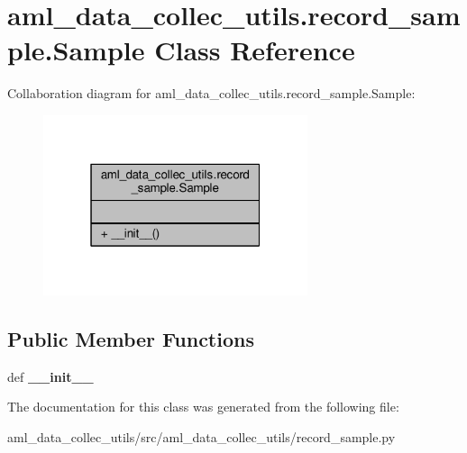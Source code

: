 \hypertarget{classaml__data__collec__utils_1_1record__sample_1_1_sample}{\section{aml\-\_\-data\-\_\-collec\-\_\-utils.\-record\-\_\-sample.\-Sample Class Reference}
\label{classaml__data__collec__utils_1_1record__sample_1_1_sample}
}


Collaboration diagram for aml\-\_\-data\-\_\-collec\-\_\-utils.\-record\-\_\-sample.\-Sample\-:
\nopagebreak
\begin{figure}[H]
\begin{center}
\leavevmode
\includegraphics[width=220pt]{classaml__data__collec__utils_1_1record__sample_1_1_sample__coll__graph}
\end{center}
\end{figure}
\subsection*{Public Member Functions}
\begin{DoxyCompactItemize}
\item 
\hypertarget{classaml__data__collec__utils_1_1record__sample_1_1_sample_aec601499ea26c9738626b603c193b962}{def {\bfseries \-\_\-\-\_\-init\-\_\-\-\_\-}}\label{classaml__data__collec__utils_1_1record__sample_1_1_sample_aec601499ea26c9738626b603c193b962}

\end{DoxyCompactItemize}


The documentation for this class was generated from the following file\-:\begin{DoxyCompactItemize}
\item 
aml\-\_\-data\-\_\-collec\-\_\-utils/src/aml\-\_\-data\-\_\-collec\-\_\-utils/record\-\_\-sample.\-py\end{DoxyCompactItemize}
